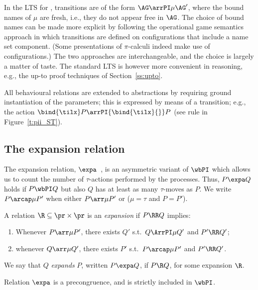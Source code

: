 In the LTS for \piI,
transitions are of the form $\AG \arrPI \mu \AG '$, where the bound names of $\mu$ are {fresh},
i.e., they  do not appear free
in $\AG$.  The choice of bound names can be made more explicit by following the operational game
semantics approach in which transitions are defined on configurations that include a name
set component. 
(Some presentations of $\pi$-calculi indeed make use of configurations.)  
The two approaches are interchangeable, and the choice is largely a matter of taste. 
The standard LTS  is however more convenient in reasoning, e.g.,  the up-to
proof techniques of Section~\ref{ss:upto}.

All behavioural relations are extended to abstractions by requiring ground
instantiation of the parameters; this is expressed by means of a transition; e.g., the action 
$ \bind{\tilx} P \arrPI {\bind{\tilx}{}}  P$ (see rule  {} in Figure~\ref{t:pii_ST}). 


\subsection{The expansion relation}


The expansion relation, $\expa$~\cite{SaWabook}, 
is an asymmetric variant of 
$\wbPI$  which allows us to  count the number of $\tau$-actions
performed by the processes. 
Thus, $P \expa Q$ holds if $P \wbPI
Q$ but also $Q $ has at least as many $\tau$-moves as $P$. 
We write $P \arcap\mu P'$  
when either $P \arr\mu P'$ or ($\mu =\tau$ and
$P=P'$).

\begin{definition}[expansion]
  A relation $\R \subseteq   \pr \times \pr $ 
  is an {\em expansion } if $P \RR Q$
  implies:
  \begin{enumerate}
  \item  Whenever 
  $P \arr\mu P'$,    
  there exists  $Q' $  s.t.\ $Q \ArrPI\mu Q'$ 
  and $P'  \RR  Q'$;
  \item whenever $Q \arr\mu Q'$, 
  there exists  $P' $  s.t.\ $P \arcap\mu P'$ 
  and $P'  \RR  Q'$.
  \end{enumerate}
  \noindent
  We say that $Q$  {\em expands } $P$, written
  $P \expa  Q$, 
  if $P  \R  Q$,  for some expansion $ \R $.   
\end{definition} 


Relation $\expa$ is a precongruence, and  is
strictly included in $\wbPI$.  

